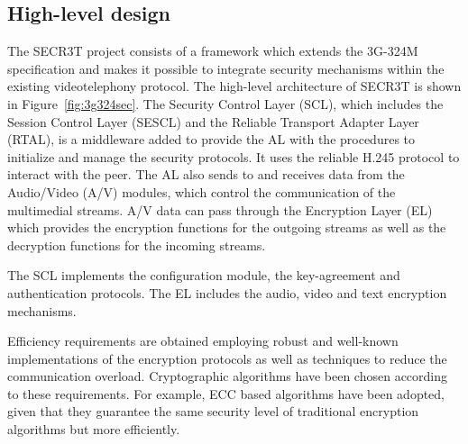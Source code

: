 \documentclass[10pt, conference, compsocconf]{IEEEtran}
\begin{document}

\subsection{High-level design}
\label{par:hlvl}
The SECR3T project consists of a framework which extends the 3G-324M specification and makes it possible to integrate security mechanisms within the existing videotelephony protocol. The high-level architecture of SECR3T is shown in Figure~\ref{fig:3g324sec}.
The Security Control Layer (SCL), which includes the Session Control Layer (SESCL) and the Reliable Transport Adapter Layer (RTAL), is a middleware added to provide the AL with the procedures to initialize and manage the security protocols. It uses the reliable H.245 protocol to interact with the peer. The AL also sends to and receives data from the Audio/Video (A/V) modules, which control the communication of the multimedial streams. A/V data can pass through the Encryption Layer (EL) which provides the encryption functions for the outgoing streams as well as the decryption functions for the incoming streams.

The SCL implements the configuration module, the key-agreement and authentication protocols. The EL includes the audio, video and text encryption mechanisms.



Efficiency requirements are obtained employing robust and well-known implementations of the encryption protocols as well as techniques to reduce the communication overload. Cryptographic algorithms have been chosen according to these requirements. For example, ECC based algorithms have been adopted, given that they guarantee the same security level of traditional encryption algorithms but more efficiently.
\end{document}
